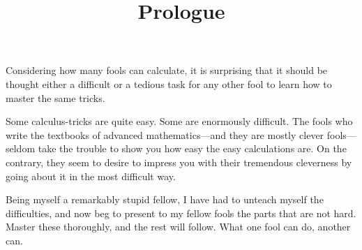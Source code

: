 \documentclass{ximera}
\title{Prologue}
\begin{document}
\begin{abstract}
\end{abstract}
\maketitle

Considering how many fools can calculate, it is surprising that it
should be thought either a difficult or a tedious task for any other
fool to learn how to master the same tricks.

Some calculus-tricks are quite easy. Some are enormously
difficult. The fools who write the textbooks of advanced
mathematics---and they are mostly clever fools---seldom take the
trouble to show you how easy the easy calculations are. On the
contrary, they seem to desire to impress you with their tremendous
cleverness by going about it in the most difficult way.

Being myself a remarkably stupid fellow, I have had to unteach myself
the difficulties, and now beg to present to my fellow fools the parts
that are not hard. Master these thoroughly, and the rest will
follow. What one fool can do, another can.
\end{document}

